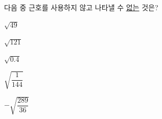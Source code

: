 다음 중 근호를 사용하지 않고 나타낼 수 \underline{없는} 것은?
\begin{choices32}{\rule[-3ex]{0pt}{8ex}$\sqrt{49}$}{\rule[-3ex]{0pt}{8ex}$\sqrt{121}$}{\rule[-3ex]{0pt}{8ex}$\sqrt{0.4}$}{\rule[-3ex]{0pt}{8ex}$\sqrt{\dfrac{1}{144}}$}{\rule[-3ex]{0pt}{8ex}$-\sqrt{\dfrac{289}{36}}$}\end{choices32}
